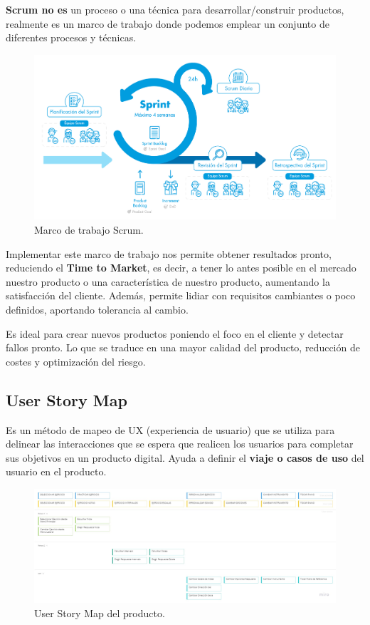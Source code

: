 \documentclass[12pt,twoside,titlepage]{report}
\begin{document}
\textbf{Scrum no es} un proceso o una técnica para desarrollar/construir productos, realmente es un marco de trabajo donde podemos emplear un conjunto de diferentes procesos y técnicas.

\begin{figure}[H]
    \centering
    \includegraphics[scale=0.39]{Scrum/Scrum}
    \caption{Marco de trabajo Scrum.}
    \label{fig:Scrum}
\end{figure}

Implementar este marco de trabajo nos permite obtener resultados pronto, reduciendo el \textbf{Time to Market}, es decir, a tener lo antes posible en el mercado nuestro producto o una característica de nuestro producto, aumentando la satisfacción del cliente. Además, permite lidiar con requisitos cambiantes o poco definidos, aportando tolerancia al cambio.

Es ideal para crear nuevos productos poniendo el foco en el cliente y detectar fallos pronto. Lo que se traduce en una mayor calidad del producto, reducción de costes y optimización del riesgo.

\subsection{User Story Map}

Es un método de mapeo de UX (experiencia de usuario) que se utiliza para delinear las interacciones que se espera que realicen los usuarios para completar sus objetivos en un producto digital. Ayuda a definir el \textbf{viaje o casos de uso} del usuario en el producto.

\begin{figure}[H]
    \centering
    \includegraphics[scale=0.25]{Scrum/UserStoryMap}
    \caption{User Story Map del producto.}
    \label{fig:UserStoryMap}
\end{figure}
\end{document}
